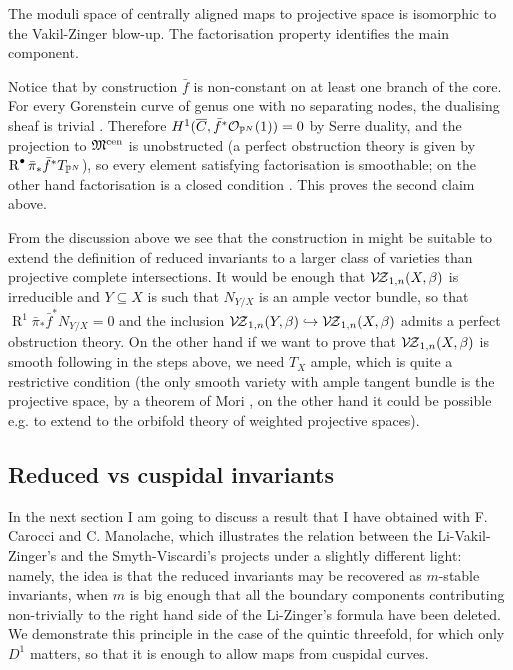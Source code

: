 \begin{thm}\cite[Theorems 4.6.3.2 and 4.5.1]{RSPW}
 The moduli space of centrally aligned maps to projective space is isomorphic to the Vakil-Zinger blow-up. The factorisation property identifies the main component.
\end{thm}
Notice that by construction $\bar{f}$ is non-constant on at least one branch of the core. For every Gorenstein curve of genus one with no separating nodes, the dualising sheaf is trivial \cite[Lemma 3.3]{SMY1}. Therefore $H^1(\overline{C},\bar{f}^*\mathcal{O}_{\mathbb P^N}(1))=0$ by Serre duality, and the projection to $\mathfrak M^{\mathrm{cen}}$ is unobstructed (a perfect obstruction theory is given by $\operatorname{R}^{\bullet}\bar{\pi}_*\bar{f}^*T_{\mathbb P^N}$), so every element satisfying factorisation is smoothable; on the other hand factorisation is a closed condition \cite[Theorem 4.3]{RSPW}. This proves the second claim above.

\begin{rmk}
 From the discussion above we see that the construction in \cite{RSPW} might be suitable to extend the definition of reduced invariants to a larger class of varieties than projective complete intersections. It would be enough that $\mathcal{V\!Z}_{1,n}(X,\beta)$ is irreducible and $Y\subseteq X$ is such that $N_{Y/X}$ is an ample vector bundle, so that $\operatorname R^1\bar{\pi}_*\bar{f}^*N_{Y/X}=0$ and the inclusion $\mathcal{V\!Z}_{1,n}(Y,\beta)\hookrightarrow\mathcal{V\!Z}_{1,n}(X,\beta)$ admits a perfect obstruction theory. On the other hand if we want to prove that $\mathcal{V\!Z}_{1,n}(X,\beta)$ is smooth following in the steps above, we need $T_X$ ample, which is quite a restrictive condition (the only smooth variety with ample tangent bundle is the projective space, by a theorem of Mori \cite{Mori}, on the other hand it could be possible e.g. to extend to the orbifold theory of weighted projective spaces).
\end{rmk}
\subsection{Reduced vs cuspidal invariants} In the next section I am going to discuss a result that I have obtained with F. Carocci and C. Manolache, which illustrates the relation between the Li-Vakil-Zinger's and the Smyth-Viscardi's projects under a slightly different light: namely, the idea is that the reduced invariants may be recovered as $m$-stable invariants, when $m$ is big enough that all the boundary components contributing non-trivially to the right hand side of the Li-Zinger's formula have been deleted. We demonstrate this principle in the case of the quintic threefold, for which only $D^1$ matters, so that it is enough to allow maps from cuspidal curves.

